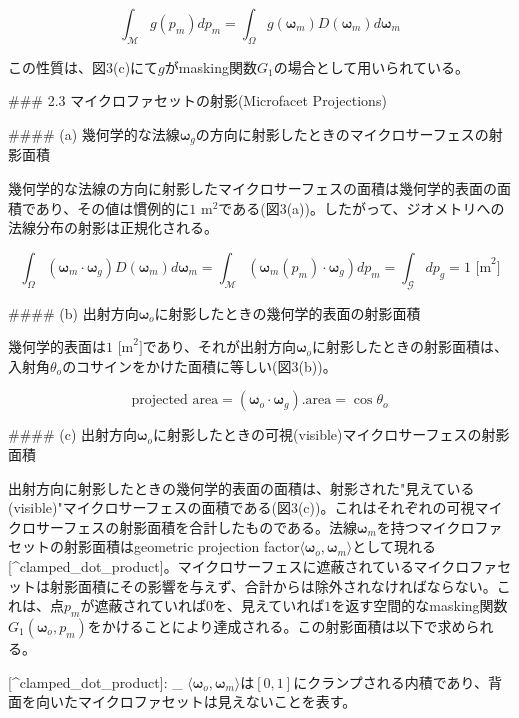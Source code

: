 \[
\int_{\mathcal M} g(p_m)dp_m = \int_{\Omega}g(\boldsymbol{\omega}_m) D(\boldsymbol{\omega}_m)d\boldsymbol{\omega}_m
\label{eq:8} \tag{8}
\]

この性質は、図3(c)にて$g$がmasking関数$G_1$の場合として用いられている。


### 2.3 マイクロファセットの射影(Microfacet Projections)

#### (a) 幾何学的な法線$\boldsymbol{\omega}_g$の方向に射影したときのマイクロサーフェスの射影面積

幾何学的な法線の方向に射影したマイクロサーフェスの面積は幾何学的表面の面積であり、その値は慣例的に$1\text{ m}^2$である(図3(a))。したがって、ジオメトリへの法線分布の射影は正規化される。

\[
\int_\Omega (\boldsymbol{\omega}_m \cdot \boldsymbol{\omega}_g) D(\boldsymbol{\omega}_m) d\boldsymbol{\omega}_m = \int_\mathcal{M} (\boldsymbol{\omega}_m(p_m) \cdot \boldsymbol{\omega}_g) dp_m = \int_\mathcal{G} dp_g = 1 \text{ [m}^2]
\label{eq:9} \tag{9}
\]

#### (b) 出射方向$\boldsymbol{\omega}_o$に射影したときの幾何学的表面の射影面積

幾何学的表面は$1\text{ [m}^2]$であり、それが出射方向$\boldsymbol{\omega}_o$に射影したときの射影面積は、入射角$\theta_o$のコサインをかけた面積に等しい(図3(b))。

\[
\text{projected area} = (\boldsymbol{\omega}_o \cdot \boldsymbol{\omega}_g) . \text{area} = \cos \theta_o
\label{eq:10} \tag{10}
\]

#### (c) 出射方向$\boldsymbol{\omega}_o$に射影したときの可視(visible)マイクロサーフェスの射影面積

出射方向に射影したときの幾何学的表面の面積は、射影された"見えている(visible)"マイクロサーフェスの面積である(図3(c))。これはそれぞれの可視マイクロサーフェスの射影面積を合計したものである。法線$\boldsymbol{\omega}_m$を持つマイクロファセットの射影面積はgeometric projection factor$\langle \boldsymbol{\omega}_o, \boldsymbol{\omega}_m \rangle$として現れる[^clamped_dot_product]。マイクロサーフェスに遮蔽されているマイクロファセットは射影面積にその影響を与えず、合計からは除外されなければならない。これは、点$p_m$が遮蔽されていれば$0$を、見えていれば$1$を返す空間的なmasking関数$G_1(\boldsymbol{\omega}_o, p_m)$をかけることにより達成される。この射影面積は以下で求められる。


[^clamped_dot_product]: _ $\langle \boldsymbol{\omega}_o, \boldsymbol{\omega}_m \rangle$は$[0, 1]$にクランプされる内積であり、背面を向いたマイクロファセットは見えないことを表す。

